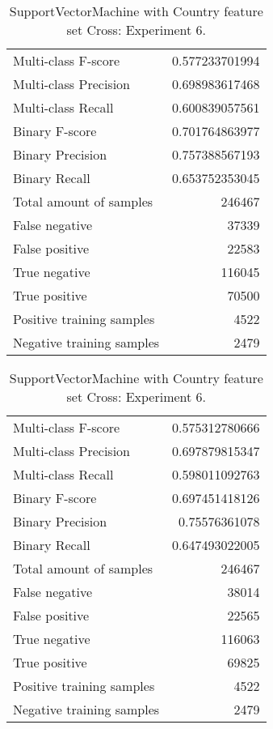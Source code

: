 \begin{table}[H]
\begin{minipage}{0.5\textwidth}
\caption{SupportVectorMachine with Country feature set Cross: Experiment 5.}
\centering
\begin{tabular}{l r}
\toprule
Multi-class F-score & 0.577233701994 \\
Multi-class Precision & 0.698983617468 \\
Multi-class Recall & 0.600839057561 \\
\midrule
Binary F-score & 0.701764863977 \\
Binary Precision & 0.757388567193 \\
Binary Recall & 0.653752353045 \\
\midrule
Total amount of samples & 246467 \\
False negative & 37339 \\
False positive & 22583 \\
True negative & 116045 \\
True positive & 70500 \\
\midrule
Positive training samples & 4522 \\
Negative training samples & 2479 \\
\bottomrule
\end{tabular}
\end{minipage}
\hfillx
\begin{minipage}{0.5\textwidth}
\caption{SupportVectorMachine with Country feature set Cross: Experiment 6.}
\centering
\begin{tabular}{l r}
\toprule
Multi-class F-score & 0.575312780666 \\
Multi-class Precision & 0.697879815347 \\
Multi-class Recall & 0.598011092763 \\
\midrule
Binary F-score & 0.697451418126 \\
Binary Precision & 0.75576361078 \\
Binary Recall & 0.647493022005 \\
\midrule
Total amount of samples & 246467 \\
False negative & 38014 \\
False positive & 22565 \\
True negative & 116063 \\
True positive & 69825 \\
\midrule
Positive training samples & 4522 \\
Negative training samples & 2479 \\
\bottomrule
\end{tabular}
\end{minipage}
\end{table}
